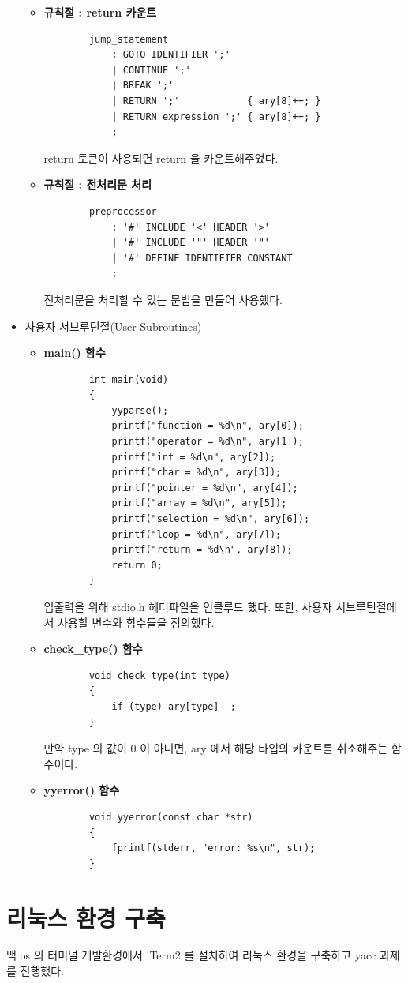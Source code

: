 \documentclass{article}
\begin{document}
\begin{itemize}
\begin{itemize}
		\item {\bf 규칙절 : return 카운트}
		\begin{lstlisting}
		jump_statement
			: GOTO IDENTIFIER ';'
			| CONTINUE ';'
			| BREAK ';'
			| RETURN ';'			{ ary[8]++; }
			| RETURN expression ';'	{ ary[8]++; }
			;
		\end{lstlisting}
		return 토큰이 사용되면 return 을 카운트해주었다.

		\item {\bf 규칙절 : 전처리문 처리}
		\begin{lstlisting}
		preprocessor
			: '#' INCLUDE '<' HEADER '>'
			| '#' INCLUDE '"' HEADER '"'
			| '#' DEFINE IDENTIFIER CONSTANT
			;
		\end{lstlisting}
		전처리문을 처리할 수 있는 문법을 만들어 사용했다.
	\end{itemize}

	\item 사용자 서브루틴절(User Subroutines)	
	\begin{itemize}
		\item {\bf main() 함수}
		\begin{lstlisting}
		int main(void)
		{
			yyparse();
			printf("function = %d\n", ary[0]);
			printf("operator = %d\n", ary[1]);
			printf("int = %d\n", ary[2]);
			printf("char = %d\n", ary[3]);
			printf("pointer = %d\n", ary[4]);
			printf("array = %d\n", ary[5]);
			printf("selection = %d\n", ary[6]);
			printf("loop = %d\n", ary[7]);
			printf("return = %d\n", ary[8]);
			return 0;
		}
		\end{lstlisting}
		입출력을 위해 stdio.h 헤더파일을 인클루드 했다.
		또한, 사용자 서브루틴절에서 사용할 변수와 함수들을 정의했다.
	
		\item {\bf check\_type() 함수}
		\begin{lstlisting}
		void check_type(int type)
		{
			if (type) ary[type]--;
		}
		\end{lstlisting}
		만약 type 의 값이 0 이 아니면, ary 에서 해당 타입의 카운트를 취소해주는 함수이다.
		
		\item {\bf yyerror() 함수}
		\begin{lstlisting}
		void yyerror(const char *str)
		{
			fprintf(stderr, "error: %s\n", str);
		}
		\end{lstlisting}
	\end{itemize}
\end{itemize}

\section{리눅스 환경 구축}
맥 os 의 터미널 개발환경에서 iTerm2 를 설치하여 리눅스 환경을 구축하고 yacc 과제를 진행했다.
\end{document}
